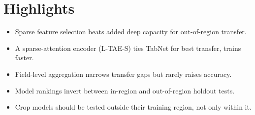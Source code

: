 \documentclass{article}
\begin{document}
\section*{Highlights}
\begin{itemize}[leftmargin=*]
  \item Sparse feature selection beats added deep capacity for out-of-region transfer.
  \item A sparse-attention encoder (L-TAE-S) ties TabNet for best transfer, trains faster.
  \item Field-level aggregation narrows transfer gaps but rarely raises accuracy.
  \item Model rankings invert between in-region and out-of-region holdout tests.
  \item Crop models should be tested outside their training region, not only within it.
\end{itemize}
\end{document}
